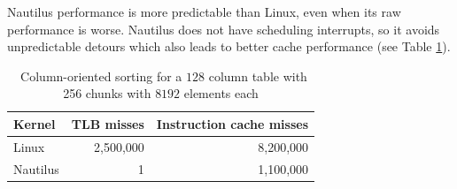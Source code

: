 Nautilus performance is more predictable than Linux, even when its raw performance is worse. Nautilus does not have scheduling interrupts, so it avoids unpredictable detours which also leads to better cache performance (see Table \ref{table:cache_miss-col}).

\begin{table}
  \bgroup
  \def\arraystretch{1.3}%
  \setlength\tabcolsep{1cm}
  \begin{tabular}{l || r | r }
    \textbf{Kernel}    & TLB misses  & Instruction cache misses \\
    \hline\hline
    Linux              & 2,500,000 & 8,200,000 \\
    Nautilus           &         1 & 1,100,000 \\

  \end{tabular}
  \egroup
  \caption{~Column-oriented sorting for a $128$ column table with 256 chunks with $8192$ elements each}
  \label{table:cache_miss-col}
\end{table}

